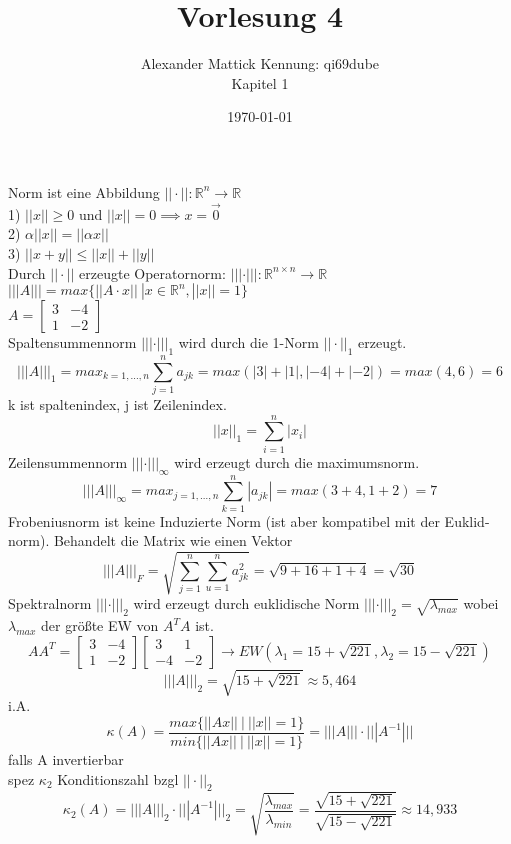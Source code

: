 \documentclass{article}
\author{
Alexander Mattick Kennung: qi69dube\\
Kapitel 1
}
\date{\today}
\title{Vorlesung 4}
\begin{document}
	\maketitle
	Norm ist eine Abbildung $||\cdot ||:\mathbb{R}^n\to \mathbb{R}$\\
	1) $||x||\geq 0$ und $||x||=0\implies x=\vec{0}$\\
	2) $\alpha||x|| = ||\alpha x||$\\
	3) $||x+y||\leq ||x||+||y||$\\
	Durch $||\cdot||$ erzeugte Operatornorm: $||| \cdot |||:\mathbb{R}^{n\times n}\to\mathbb{R}$\\
	$|||A||| =max\{||A\cdot x||\ | x\in\mathbb{R}^n, ||x||=1\}$\\
	$A=\begin{bmatrix} 3&-4\\ 1&-2\end{bmatrix}$\\
	Spaltensummennorm $||| \cdot |||_1$ wird durch die 1-Norm $||\cdot||_1$ erzeugt.\\
	\[|||A|||_1 = max_{k=1,\dots,n}\sum^n_{j=1} a_{jk}=max(|3|+|1|,|-4|+|-2|)=max(4,6)=6\]
	k ist spaltenindex, j ist Zeilenindex.\\
	\[||x||_1=\sum^n_{i=1} |x_i|\]
	Zeilensummennorm $|||\cdot |||_\infty$ wird erzeugt durch die maximumsnorm.\\
	\[|||A|||_\infty=max_{j=1,\dots,n}\sum^n_{k=1}|a_{jk}| = max(3+4,1+2)=7\]
	Frobeniusnorm ist keine Induzierte Norm (ist aber kompatibel mit der Euklid-norm). Behandelt die Matrix wie einen Vektor
	\[|||A|||_F = \sqrt{\sum^n_{j=1}\sum^n_{u=1} a_{jk}^2} = \sqrt{9+16+1+4}=\sqrt{30}\]
	Spektralnorm $|||\cdot |||_2$ wird erzeugt durch euklidische Norm $|||\cdot|||_2 =\sqrt{\lambda_{max}}$  wobei $\lambda_{max}$ der größte EW von $A^TA$ ist.\\
	\[AA^T = \begin{bmatrix} 3&-4\\ 1&-2\end{bmatrix}\begin{bmatrix} 3&1\\-4&-2\end{bmatrix} \to EW(\lambda_1=15+\sqrt{221},\lambda_2=15-\sqrt{221})\]
	\[|||A|||_2 = \sqrt{15+\sqrt{221}}\approx 5,464\]
	i.A.
	\[\kappa(A)=\frac{max\{||Ax||\ |\ ||x||=1\}}{min\{||Ax||\ |\ ||x||=1\}} = |||A|||\cdot |||A^{-1}|||\]
	falls A invertierbar\\
	spez $\kappa_2$ Konditionszahl bzgl $||\cdot ||_2$
	\[\kappa_2(A) =|||A|||_2\cdot |||A^{-1}|||_2 = \sqrt{\frac{\lambda_{max}}{\lambda_{min}}} =\frac{\sqrt{15+\sqrt{221}}}{\sqrt{15-\sqrt{221}}}\approx 14,933 \]
\end{document}
